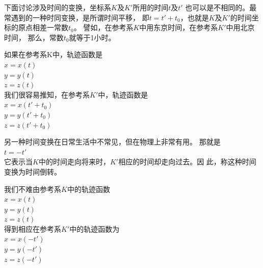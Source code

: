 下面讨论涉及时间的变换，坐标系$K$及$K'$所用的时间$t$及$t'$
也可以是不相同的。最常遇到的一种时同变换，是所谓时间平移，
即$t=t'+t_0$，也就是$K$及$K'$的时间坐标的原点相差一常数$t_0$。
譬如，在参考系$K$中用东京时间，在参考系$K'$中用北京时间，
那么，常数$t_0$就等于1小时。

如果在参考系K中，轨迹函数是\vspace{-0.2em}
\\\null\hspace{6em}$x=x\left(t\right)$
\\\null\hspace{6em}$y=y\left(t\right)$
\\\null\hspace{6em}$z=z\left(t\right)$\\
我们很容易推知，在参考系$K'$中，轨迹函数是\vspace{-0.2em}
\\\null\hspace{6em}$x=x\left(t'+t_0\right)$
\\\null\hspace{6em}$y=y\left(t'+t_0\right)$
\\\null\hspace{6em}$z=z\left(t'+t_0\right)$

另一种时间变换在日常生活中不常见，但在物理上非常有用。
那就是\vspace{-0.5em}
\\\null\hspace{6em}$t=-t'$\\
它表示当$K$中的时间走向将来时，$K'$相应的时间却走向过去。因
此，称这种时间变换为时间倒转。

我们不难由参考系$K$中的轨迹函数\vspace{-0.2em}
\\\null\hspace{6em}$x=x\left(t\right)$
\\\null\hspace{6em}$y=y\left(t\right)$
\\\null\hspace{6em}$z=z\left(t\right)$\\
得到相应在参考系$K'$中的轨迹函数为\vspace{-0.2em}
\\\null\hspace{6em}$x=x\left(-t'\right)$
\\\null\hspace{6em}$y=y\left(-t'\right)$
\\\null\hspace{6em}$z=z\left(-t'\right)$

